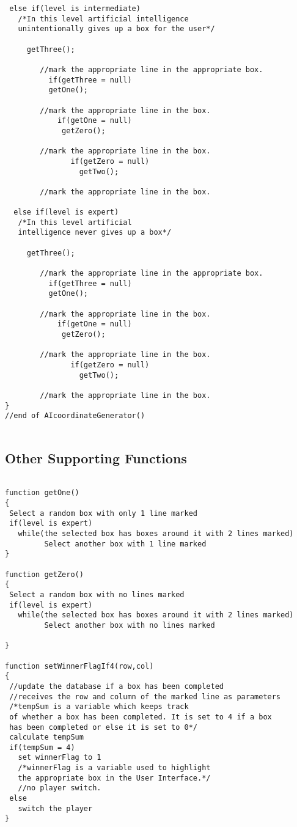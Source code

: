 \documentclass[a4paper,12pt]{article}
\begin{document}
\begin{verbatim}
 else if(level is intermediate)
   /*In this level artificial intelligence
   unintentionally gives up a box for the user*/
    
     getThree();
        
        //mark the appropriate line in the appropriate box.
          if(getThree = null)
          getOne();
        
        //mark the appropriate line in the box.
            if(getOne = null)
             getZero();
           
        //mark the appropriate line in the box.
               if(getZero = null)
                 getTwo();
          
        //mark the appropriate line in the box.

  else if(level is expert)
   /*In this level artificial 
   intelligence never gives up a box*/  

     getThree();
        
        //mark the appropriate line in the appropriate box.
          if(getThree = null)
          getOne();
        
        //mark the appropriate line in the box.
            if(getOne = null)
             getZero();
           
        //mark the appropriate line in the box.
               if(getZero = null)
                 getTwo();
          
        //mark the appropriate line in the box.  
}
//end of AIcoordinateGenerator()


\end{verbatim}


\subsection{Other Supporting Functions}
\begin{verbatim}

function getOne()
{
 Select a random box with only 1 line marked
 if(level is expert)
   while(the selected box has boxes around it with 2 lines marked)
         Select another box with 1 line marked
}

function getZero()
{
 Select a random box with no lines marked
 if(level is expert)
   while(the selected box has boxes around it with 2 lines marked)
         Select another box with no lines marked

}

function setWinnerFlagIf4(row,col)
{
 //update the database if a box has been completed
 //receives the row and column of the marked line as parameters
 /*tempSum is a variable which keeps track 
 of whether a box has been completed. It is set to 4 if a box 
 has been completed or else it is set to 0*/ 
 calculate tempSum
 if(tempSum = 4)
   set winnerFlag to 1
   /*winnerFlag is a variable used to highlight 
   the appropriate box in the User Interface.*/
   //no player switch.
 else
   switch the player
} 

\end{verbatim}                                             
\end{document}
